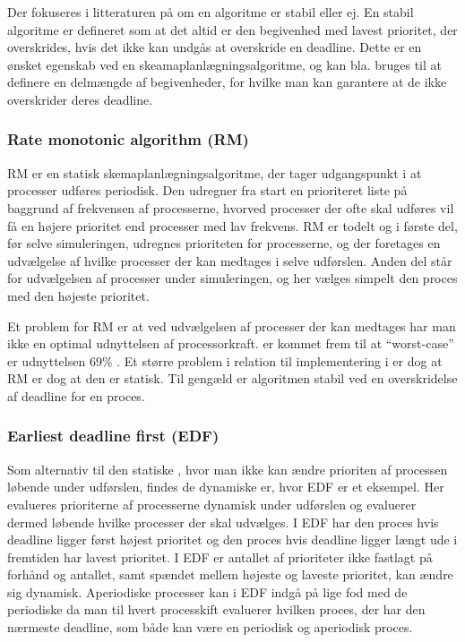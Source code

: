 Der fokuseres i litteraturen på om en algoritme er stabil eller ej. En stabil algoritme er defineret som at det altid er den  begivenhed med lavest prioritet, der overskrides, hvis det ikke kan undgås at overskride en deadline. Dette er en ønsket egenskab ved en skeamaplanlægningsalgoritme, og kan bla. bruges til at  definere en delmængde af begivenheder, for hvilke man kan garantere at de ikke overskrider deres deadline. 

\subsubsection{Rate monotonic algorithm (RM)}
RM er en statisk skemaplanlægningsalgoritme, der tager udgangspunkt i at processer udføres periodisk. Den udregner fra start en prioriteret liste på baggrund af frekvensen af processerne, hvorved processer der ofte skal udføres vil få en højere prioritet end processer med lav frekvens. RM er todelt og i første del, før selve simuleringen, udregnes prioriteten for processerne, og der foretages en udvælgelse af hvilke processer der kan medtages i selve udførslen. Anden del står for udvælgelsen af processer  under simuleringen, og her vælges simpelt den proces med den højeste prioritet. 

Et problem for RM er at ved udvælgelsen af processer der kan medtages har man ikke en optimal udnyttelsen af processorkraft.  er kommet frem til at ``worst-case'' er udnyttelsen 69\% \cite{lehoczky1989rate}. Et større problem i relation til implementering i \pycsp er dog at RM er dog at den er statisk. Til gengæld er algoritmen stabil ved en overskridelse af deadline for en proces. 

\subsubsection{Earliest deadline first (EDF)}
\label{sec:edf}
Som alternativ til den statiske \sched, hvor man ikke kan ændre prioriten af processen løbende under udførslen, findes de dynamiske \sched er, hvor  EDF er et eksempel. Her evalueres prioriterne af processerne dynamisk under udførslen og evaluerer dermed løbende hvilke processer der skal udvælges. I EDF har den proces hvis deadline ligger først højest prioritet og den proces hvis deadline ligger længt ude i fremtiden har lavest prioritet. I EDF er antallet af prioriteter ikke fastlagt på forhånd og antallet, samt spændet mellem højeste og laveste prioritet, kan ændre sig dynamisk. Aperiodiske processer kan i EDF indgå på lige fod med de periodiske da man til hvert processkift evaluerer hvilken proces, der har den nærmeste deadline, som både kan være en periodisk og aperiodisk proces.

